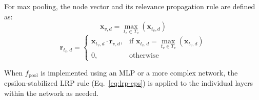 For max pooling, the node vector and its relevance propagation rule are defined as:
\begin{equation}
    \mathbf{x}_{v,d} = \max_{t_v \in T_v}(\mathbf{x}_{t_v,d})
    \label{eq:maxpool}
\end{equation}
\begin{equation}
    \mathbf{r}_{t_v,d} = 
    \begin{cases} 
        \mathbf{x}_{t_v,d} \cdot \mathbf{r}_{v,d}, & \text{if } \mathbf{x}_{t_v,d} = \max_{t_v \in T_v}(\mathbf{x}_{t_v,d}) \\
        0, & \text{otherwise}
    \end{cases}
    \label{eq:lrp-maxpool}
\end{equation}

When \( f_{\text{pool}} \) is implemented using an MLP or a more complex network, the epsilon-stabilized LRP rule (Eq.~\ref{eq:lrp-eps}) is applied to the individual layers within the network as needed.




